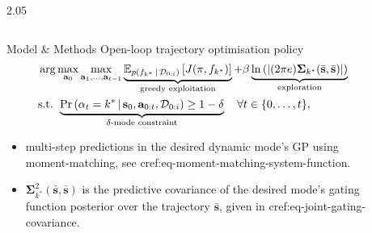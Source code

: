 \documentclass[final,12pt]{beamer}
\newlength{\sepwidth}
\newlength{\colwidth}
\newcommand{\separatorcolumn}{\begin{column}{\sepwidth}\end{column}}
\newcommand{\E}{\mathbb{E}}    %
\renewcommand{\mid}{\,|\,}
\DeclareMathOperator{\E}{\mathbb{E}}
\newcommand{\modeInd}{\ensuremath{k}}
\newcommand{\modeDesInd}{\ensuremath{\text{des}}}
\newcommand{\modeDes}[1]{\ensuremath{#1^{\modeDesInd}}}
\newcommand{\state}{\ensuremath{\mathbf{x}}}
\newcommand{\control}{\ensuremath{\mathbf{u}}}
\newcommand{\dataset}{\ensuremath{\mathcal{D}}}
\newcommand{\modeVar}{\ensuremath{\alpha}}
\newcommand{\gatingFunc}{\ensuremath{h}}
\newcommand{\timeInd}{\ensuremath{t}}
\newcommand{\TimeInd}{\ensuremath{\MakeUppercase{\timeInd}}}
\newcommand{\dynamicsFunc}{\ensuremath{f}}
\newcommand{\stateTraj}{\ensuremath{\bar{\state}}}
\newcommand{\desiredMode}{\ensuremath{\modeInd^{*}}}
\renewcommand{\modeDes}[1]{\ensuremath{#1_{\desiredMode}}}
\newcommand{\desiredGatingFunction}{\ensuremath{\modeDes{\gatingFunc}}}
\renewcommand{\state}{\ensuremath{\mathbf{s}}}
\renewcommand{\dataset}{\ensuremath{\mathcal{D}}}
\renewcommand{\control}{\ensuremath{\mathbf{a}}}
\newcommand{\action}{\ensuremath{\control}}
\renewcommand{\action}{\ensuremath{\mathbf{a}}}
\begin{document}
\begin{frame}[t]
\begin{columns}[t]
\begin{column}{2.05\colwidth}
\begin{columns}[t]
\begin{column}{\colwidth}
\begin{block}{Model \& Methods}
  Open-loop trajectory optimisation policy
  \begin{subequations} \label{eq-trajectory-optimisation}
  \begin{align}
  &\arg\max_{\action_{0}}\max_{\action_{1}, \ldots, \action_{\TimeInd-1}}
  \underbrace{\E_{p(\dynamicsFunc_{\desiredMode} \mid \dataset_{0:i})} \left[ J(\pi, \dynamicsFunc_{\desiredMode}) \right]}_{\text{greedy exploitation}}
  + \beta \underbrace{\ln \left( | (2\pi e) \bm\Sigma_{\desiredMode}(\bar{\state}, \bar{\state}) | \right)}_{\text{exploration}} \\
  &\text{s.t. } \underbrace{ \Pr \left(\modeVar_{\timeInd} = \desiredMode \mid \state_{0}, \action_{0:t}, \mathcal{D}_{0:i} \right)
  \geq 1-\delta}_{\delta\text{-mode constraint}} \quad \forall \timeInd \in \{0,\ldots, \TimeInd\}, \label{eq-constraint-approx}
  \end{align}
  \end{subequations}
  \begin{itemize}
  \item multi-step predictions in the desired dynamic mode's GP using moment-matching, see cref:eq-moment-matching-system-function.
  \item $\bm\Sigma^{2}_{\desiredMode}(\bar{\state},\bar{\state})$ is the predictive covariance of the desired mode's
  gating function posterior over the trajectory $\bar{\state}$, given in cref:eq-joint-gating-covariance.
  \end{itemize}




  \end{block}

\end{column}

\separatorcolumn

\begin{column}{\colwidth}


\end{column}
\end{columns}
\end{column}
\end{columns}
\end{frame}
\end{document}

